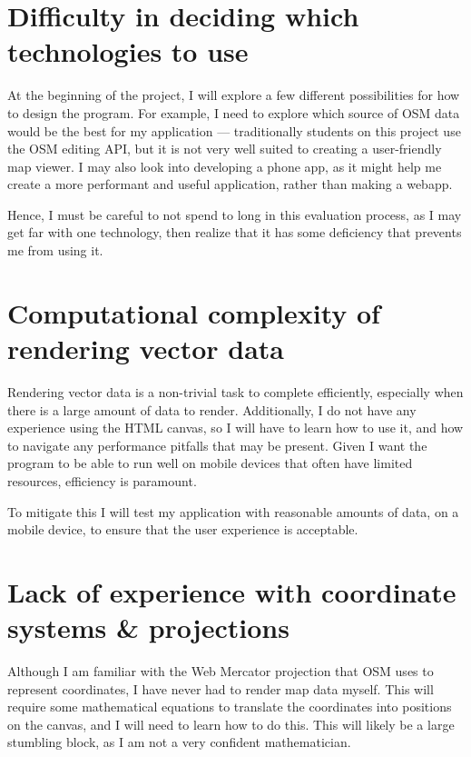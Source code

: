 \documentclass[]{final_report}
\begin{document}
\section{Difficulty in deciding which technologies to use}\label{sec:difficult-technologies}

At the beginning of the project, I will explore a few different possibilities for how to design the program. For example, I need to explore which source of OSM data would be the best for my application --- traditionally students on this project use the OSM editing API, but it is not very well suited to creating a user-friendly map viewer. I may also look into developing a phone app, as it might help me create a more performant and useful application, rather than making a webapp.

Hence, I must be careful to not spend to long in this evaluation process, as I may get far with one technology, then realize that it has some deficiency that prevents me from using it.

\section{Computational complexity of rendering vector data}

Rendering vector data is a non-trivial task to complete efficiently, especially when there is a large amount of data to render. Additionally, I do not have any experience using the HTML canvas, so I will have to learn how to use it, and how to navigate any performance pitfalls that may be present. Given I want the program to be able to run well on mobile devices that often have limited resources, efficiency is paramount.

To mitigate this I will test my application with reasonable amounts of data, on a mobile device, to ensure that the user experience is acceptable. 

\section{Lack of experience with coordinate systems \& projections}\label{sec:coordinate-systems}

Although I am familiar with the Web Mercator projection that OSM uses to represent coordinates, I have never had to render map data myself. This will require some mathematical equations to translate the coordinates into positions on the canvas, and I will need to learn how to do this. This will likely be a large stumbling block, as I am not a very confident mathematician.
\end{document}
